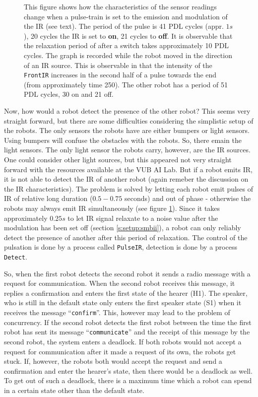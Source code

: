 \begin{figure}
\centerline{}
\caption{This figure shows how the characteristics of the sensor readings change when a pulse-train is set to the emission and modulation of the IR (see text). The period of the pulse is 41 PDL cycles (appr. $1 s$), 20 cycles the IR is set to {\bf on}, 21 cycles to {\bf off}. It is observable that the relaxation period of after a switch takes approximately 10 PDL cycles. The graph is recorded while the robot moved in the direction of an IR source. This is observable in that the intensity of the \texttt{FrontIR} increases in the second half of a pulse towards the end (from approximately time 250). The other robot has a period of 51 PDL cycles, 30 on and 21 off.}
\label{f:pulses}
\end{figure}

\p
Now, how would a robot detect the presence of the other robot? This seems very straight forward, but there are some difficulties considering the simplistic setup of the robots. The only sensors the robots have are either bumpers or light sensors. Using bumpers will confuse the obstacles with the robots. So, there emain the light sensors. The only light sensor the robots carry, however, are the IR sources. One could consider other light sources, but this appeared not very straight forward with the resources available at the VUB AI Lab. But if a robot emits IR, it is not able to detect the IR of another robot (again remeber the discussion on the IR characteristics). The problem is solved by letting each robot emit pulses of IR of relative long duration ($0.5-0.75$ seconds) and out of phase - otherwise the robots may always emit IR simultaneously (see figure \ref{f:pulses}). Since it takes approximately $0.25 s$ to let IR signal relaxate to a noise value after the modulation has been set off (section \ref{s:setup:smbii}), a robot can only reliably detect the presence of another after this period of relaxation. The control of the pulsation is done by a process called \texttt{PulseIR}, detection is done by a process \texttt{Detect}.

\p
So, when the first robot detects the second robot it sends a radio message with a request for communication. When the second robot receives this message, it replies a confirmation and enters the first state of the hearer (H1). The speaker, who is still in the default state only enters the first speaker state (S1) when it receives the message ``\texttt{confirm}''. This, however may lead to the problem of concurrency. If the second robot detects the first robot between the time the first robot has sent its message ``\texttt{communicate}'' and the receipt of this message by the second robot, the system enters a deadlock. If both robots would not accept a request for communication after it made a request of its own, the robots get stuck. If, however, the robots both would accept the request and send a confirmation and enter the hearer's state, then there would be a deadlock as well. To get out of such a deadlock, there is a maximum time which a robot can spend in a certain state other than the default state.

